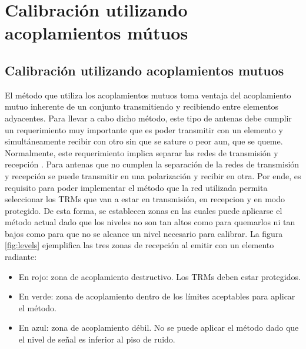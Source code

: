 \chapter{Calibración utilizando acoplamientos mútuos}
\label{ch:convertidores}

\section{Calibración utilizando acoplamientos mutuos}

El método que utiliza los acoplamientos mutuos toma ventaja del acoplamiento mutuo inherente de un conjunto transmitiendo
y recibiendo entre elementos adyacentes. Para llevar a cabo dicho método, este tipo de antenas debe cumplir un
requerimiento muy importante que es poder transmitir con un elemento y simultáneamente recibir con otro sin que se sature o peor
aun, que se queme. Normalmente, este requerimiento implica separar las redes de transmisión y recepción \cite{Gao2001}. Para 
antenas que no cumplen la separación de la redes de transmisión y recepción se puede transmitir en una polarización y recibir
en otra. Por ende, es requisito para poder implementar el método que la red utilizada permita seleccionar los TRMs que van a 
estar en transmisión, en recepcion y en modo protegido. De esta forma, se establecen zonas en las cuales puede aplicarse el 
método actual dado que los niveles no son tan altos como para quemarlos ni tan bajos como para que no se alcance un nivel 
necesario para calibrar. La figura \ref{fig:levels} ejemplifica las tres zonas de recepción al emitir con un elemento radiante:
\begin{itemize}
	\item En rojo: zona de acoplamiento destructivo. Los TRMs deben estar protegidos.
	\item En verde: zona de acoplamiento dentro de los límites aceptables para aplicar el método.
	\item En azul: zona de acoplamiento débil. No se puede aplicar el método dado que el nivel de señal es inferior al piso de 
		ruido. 
\end{itemize}

